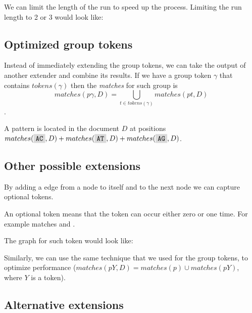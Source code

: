 \begin{figure}[H]
	
\end{figure}

We can limit the length of the run to speed up the process. Limiting the run length to 2 or 3 would look like:

\begin{figure}[H]
	
\end{figure}

\subsection{Optimized group tokens}

Instead of immediately extending the group tokens, we can take the output of another extender and combine its results. If we have a group token $\gamma$ that contains $tokens(\gamma)$ then the \emph{matches} for such group is $$matches(p\gamma, D) = \bigcup_{t \in tokens(\gamma)} matches(pt, D) $$.

\begin{exmp}
A pattern  is located in the document $D$ at positions $matches(\R{AC}, D) + matches(\R{AT}, D) + matches(\R{AG}, D)$.
\end{exmp}

\subsection{Other possible extensions}

By adding a edge from a node to itself and to the next node we can capture optional tokens.

\begin{exmp}
An optional token  means that the token  can occur either zero or one time. For example  matches  and .
\end{exmp}

The graph for such token would look like:

\begin{figure}[H]
	
\end{figure}

 Similarly, we can use the same technique that we used for the group tokens, to optimize performance ($matches(pY, D) = matches(p) \cup matches(pY)$, where $Y$ is a token).

\subsection{Alternative extensions}

